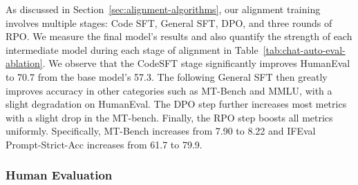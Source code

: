 \documentclass[11pt]{article}
\newcommand{\oursin}{Nemotron-4-340B-Instruct}
\begin{document}
As discussed in Section~\ref{sec:alignment-algorithms}, our alignment training involves multiple stages: Code SFT, General SFT, DPO, and three rounds of RPO. We measure the final model's results and also quantify the strength of each intermediate model during each stage of alignment in Table~\ref{tab:chat-auto-eval-ablation}. We observe that the CodeSFT stage significantly improves HumanEval to 70.7 from the base model's 57.3. The following General SFT then greatly improves accuracy in other categories such as MT-Bench and MMLU, with a slight degradation on HumanEval. The DPO step further increases most metrics with a slight drop in the MT-bench. Finally, the RPO step boosts all metrics uniformly. Specifically, MT-Bench increases from 7.90 to 8.22 and IFEval Prompt-Strict-Acc increases from 61.7 to 79.9. 


\begin{table}[ht!]
\centering
\renewcommand{\arraystretch}{1.5} %

\caption{Evaluation results of each intermediate model in the alignment process, where the last column corresponds to our \oursin{}.}
\label{tab:chat-auto-eval-ablation}

\end{table}



\subsubsection{Human Evaluation}
\end{document}
